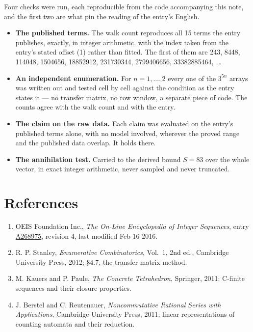 \documentclass[11pt]{article}
\theoremstyle{definition}
\begin{document}
Four checks were run, each reproducible from the code accompanying this note, and the first two are what pin the reading of the entry's English.

\begin{itemize}

\item {\bfseries The published terms.} The walk count reproduces all 15 terms the entry publishes, exactly, in integer arithmetic, with the index taken from the entry's stated offset (1) rather than fitted. The first of them are 243, 8448, 114048, 1504656, 18852912, 231730344, 2799406656, 33382885464,~\dots

\item {\bfseries An independent enumeration.} For $n = 1,\dots,2$ every one of the $3^{5n}$ arrays was written out and tested cell by cell against the condition as the entry states it --- no transfer matrix, no row window, a separate piece of code. The counts agree with the walk count and with the entry.

\item {\bfseries The claim on the raw data.} Each claim was evaluated on the entry's published terms alone, with no model involved, wherever the proved range and the published data overlap. It holds there.

\item {\bfseries The annihilation test.} Carried to the derived bound $S = 83$ over the whole vector, in exact integer arithmetic, never sampled and never truncated.

\end{itemize}

\section{References}

\begin{enumerate}

\item OEIS Foundation Inc., \emph{The On-Line Encyclopedia of Integer Sequences}, entry \href{https://oeis.org/A268975}{A268975}, revision 4, last modified Feb 16 2016.

\item R. P. Stanley, \emph{Enumerative Combinatorics}, Vol.~1, 2nd ed., Cambridge University Press, 2012; \S4.7, the transfer-matrix method.

\item M. Kauers and P. Paule, \emph{The Concrete Tetrahedron}, Springer, 2011; C-finite sequences and their closure properties.

\item J. Berstel and C. Reutenauer, \emph{Noncommutative Rational Series with Applications}, Cambridge University Press, 2011; linear representations of counting automata and their reduction.

\end{enumerate}
\end{document}
